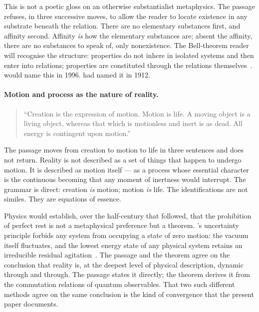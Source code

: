 This is not a poetic gloss on an otherwise substantialist metaphysics.
The passage refuses, in three successive moves, to allow the reader to locate
existence in any substrate beneath the relation.
There are no elementary substances first, and affinity second.
Affinity \emph{is} how the elementary substances are; absent the affinity, there
are no substances to speak of, only nonexistence.
The Bell-theorem reader will recognise the structure: properties do not inhere
in isolated systems and then enter into relations; properties are constituted
through the relations themselves~\citep{Bell1964,Rovelli1996}.
\citeauthor{Rovelli1996} would name this in 1996.
\AbdulBaha had named it in 1912.

\paragraph{Motion and process as the nature of reality.}
\begin{quote}
``Creation is the expression of motion. Motion is life. A moving object
is a living object, whereas that which is motionless and inert is as dead.
All energy is contingent upon motion.''
\citep[Talk 52]{PUP}
\end{quote}

The passage moves from creation to motion to life in three sentences and does
not return.
Reality is not described as a set of things that happen to undergo motion.
It is described as motion itself --- as a process whose essential character is
the continuous becoming that any moment of inertness would interrupt.
The grammar is direct: creation \emph{is} motion; motion \emph{is} life.
The identifications are not similes.
They are equations of essence.

Physics would establish, over the half-century that followed, that the
prohibition of perfect rest is not a metaphysical preference but a theorem.
\citeauthor{Heisenberg1927}'s uncertainty principle forbids any system from
occupying a state of zero motion: the vacuum itself fluctuates, and the lowest
energy state of any physical system retains an irreducible residual
agitation~\citep{Heisenberg1927}.
The passage and the theorem agree on the conclusion that reality is, at the
deepest level of physical description, dynamic through and through.
The passage states it directly; the theorem derives it from the commutation
relations of quantum observables.
That two such different methods agree on the same conclusion is the kind of
convergence that the present paper documents.

